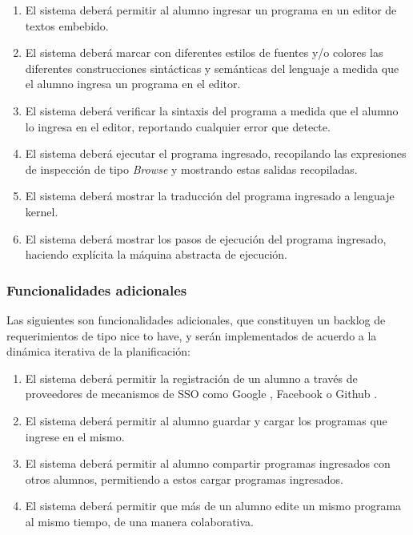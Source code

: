 \documentclass[a4paper,11pt]{article}
\begin{document}
\begin{enumerate}

  \item El sistema deberá permitir al alumno ingresar un programa en un
    editor de textos embebido.

  \item El sistema deberá marcar con diferentes estilos de fuentes y/o
    colores las diferentes construcciones sintácticas y semánticas del
      lenguaje a medida que el alumno ingresa un programa en el editor.

    \item El sistema deberá verificar la sintaxis del programa a medida que el
      alumno lo ingresa en el editor, reportando cualquier error que detecte.

    \item El sistema deberá ejecutar el programa ingresado, recopilando las
      expresiones de inspección de tipo \textit{Browse} y mostrando estas
      salidas recopiladas.

    \item El sistema deberá mostrar la traducción del programa ingresado a
      lenguaje kernel.

    \item El sistema deberá mostrar los pasos de ejecución del programa
      ingresado, haciendo explícita la máquina abstracta de ejecución.

\end{enumerate}

\subsubsection{Funcionalidades adicionales}

Las siguientes son funcionalidades adicionales, que constituyen un backlog de
requerimientos de tipo nice to have, y serán implementados de acuerdo a la
dinámica iterativa de la planificación:

\begin{enumerate}

  \item El sistema deberá permitir la registración de un alumno a través de
    proveedores de mecanismos de SSO como Google \cite{googleoauth}, Facebook
    \cite{facebookoauth} o Github \cite{githuboauth}.

  \item El sistema deberá permitir al alumno guardar y cargar los programas
    que ingrese en el mismo.

  \item El sistema deberá permitir al alumno compartir programas ingresados
    con otros alumnos, permitiendo a estos cargar programas ingresados.

  \item El sistema deberá permitir que más de un alumno edite un mismo
    programa al mismo tiempo, de una manera colaborativa.

\end{enumerate}
\end{document}
